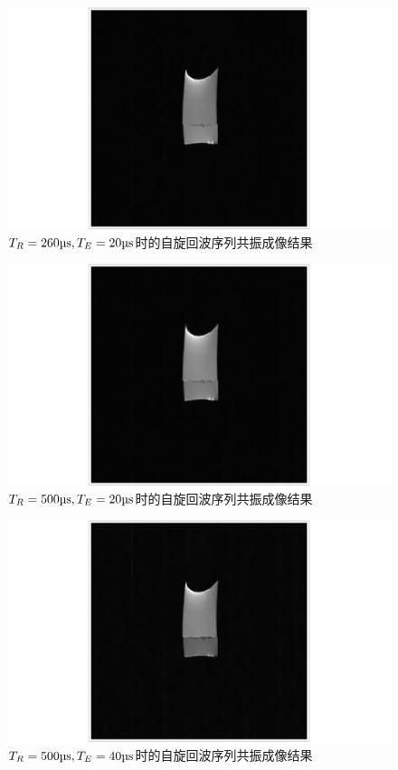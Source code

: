 \documentclass{thuemp}
\begin{document}
\begin{figure}[H]
    \centering
    \includegraphics[width=0.8\linewidth]{../Data/pre-experiment/MRI_result_TR_0260_TE_020.png}
    \caption{$T_R = \text{\si{260 \micro\second}}, T_E = \text{\si{20 \micro\second}}$时的自旋回波序列共振成像结果}
    \label{fig:mri_0260_020}
\end{figure}

\begin{figure}[H]
    \centering
    \includegraphics[width=0.8\linewidth]{../Data/pre-experiment/MRI_result_TR_0500_TE_020.png}
    \caption{$T_R = \text{\si{500 \micro\second}}, T_E = \text{\si{20 \micro\second}}$时的自旋回波序列共振成像结果}
    \label{fig:mri_0500_020}
\end{figure}

\begin{figure}[H]
    \centering
    \includegraphics[width=0.8\linewidth]{../Data/pre-experiment/MRI_result_TR_0500_TE_040.png}
    \caption{$T_R = \text{\si{500 \micro\second}}, T_E = \text{\si{40 \micro\second}}$时的自旋回波序列共振成像结果}
    \label{fig:mri_0500_040}
\end{figure}
\end{document}
